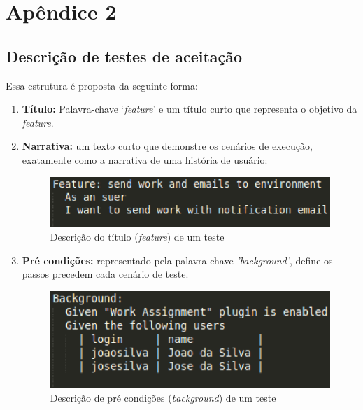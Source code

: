 \newpage

\chapter{Apêndice 2}
\label{apendice2}

\section{Descrição de testes de aceitação}

Essa estrutura é proposta da seguinte forma:

\begin{enumerate}
\item \textbf{Título:} Palavra-chave ‘\textit{feature}’ e um título curto que representa o 
objetivo da \textit{feature}.
\item \textbf{Narrativa:} um texto curto que demonstre os cenários de execução, 
exatamente como a narrativa de uma história de usuário:

\begin{figure}[!h]
    \centering
    \includegraphics[keepaspectratio=true,scale=0.50]
      {figuras/noosfero_feature2.eps}
    \caption{Descrição do título (\textit{feature}) de um teste}
    \label{nosfero_feature}
\end{figure}

\item \textbf{Pré condições:} representado pela palavra-chave \textit{'background'}, define os passos 
precedem cada cenário de teste.

\begin{figure}[!h]
    \centering
    \includegraphics[keepaspectratio=true,scale=0.50]
      {figuras/noosfero_back.eps}
    \caption{Descrição de pré condições (\textit{background}) de um teste}
    \label{nosfero_feature}
\end{figure}


\end{enumerate}

